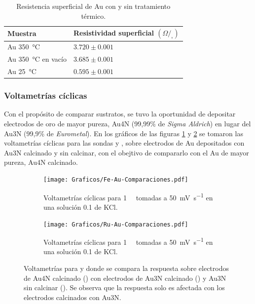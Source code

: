 {				\begin{table}[ht!]
			  		  \caption[Resistencia superficial de los electrodos]{Resistencia superficial de Au con y sin tratamiento térmico.} 
			  		  \begin{tabular}{>{\raggedright\arraybackslash}m{3.6cm}>{\raggedright\arraybackslash}m{5cm}} 
			  		  \toprule
					  Muestra & Resistividad superficial $(\Omega/_{\square})$  \\ \midrule
			      	  Au\index{oro} \SI{350}{\celsius} 		  	& $3.720 \pm 0.001$		 \\	  
			      	  Au\index{oro} \SI{350}{\celsius} en vacío	& $3.685 \pm 0.001$		 \\	  
			      	  Au\index{oro} \SI{25}{\celsius}    	  		& $0.595 \pm 0.001$		 \\ 
			      	  \bottomrule
			    	  \end{tabular}
			    	  \label{tabla:resistencia}
			   		  \end{table}
		
		\subsubsection{Voltametrías cíclicas}

			Con el propósito de comparar sustratos, se tuvo la oportunidad de depositar electrodos de oro de mayor pureza, Au4N (99,99\% de \textit{Sigma Aldrich}) en lugar del Au3N (99,9\% de \textit{Eurometal}). En los gráficos de las figuras \ref{fig:Fe-Au-compa} y \ref{fig:Ru-Au-compa} se tomaron las voltametrías cíclicas para las sondas \aminorutenio\space  y \ferroferri, sobre electrodos de Au depositados con Au3N calcinado y sin calcinar, con el obejtivo de compararlo con el Au de mayor pureza, Au4N calcinado. 

				\begin{figure}[ht]
		 	      \begin{subfigure}[t]{0.495\textwidth}
		          	\texttt{[image: Graficos/Fe-Au-Comparaciones.pdf]}
		         	\caption{Voltametrías cíclicas para \fe\space \SI{1}{\milli\Molar} tomadas a \SI{50}{\milli\volt\per\second} en una solución \SI{0.1}{\Molar} de KCl.}
		          	\label{fig:Fe-Au-compa}
		      		\end{subfigure}
		      	 \begin{subfigure}[t]{0.495\textwidth}
		          	\texttt{[image: Graficos/Ru-Au-Comparaciones.pdf]}
		         	\caption{Voltametrías cíclicas para \ru\space \SI{1}{\milli\Molar} tomadas a \SI{50}{\milli\volt\per\second} en una solución \SI{0.1}{\Molar} de KCl.}
		          	\label{fig:Ru-Au-compa}
		      		\end{subfigure}
		      	 \caption[Comparación entre electrodos calcinados y sin calcinar]{Voltametrías para \fe\space y \ru\space donde se compara la respuesta sobre electrodos de Au4N calcinado (\usebox{\oliva}) con electrodos de Au3N calcinado (\usebox{\negro}) y Au3N sin calcinar (\usebox{\rojo}). Se observa que la respuesta solo es afectada con los electrodos calcinados con Au3N.}
		      	 \label{Fig:Comparacion-Au}
	      		 \end{figure}	

}

